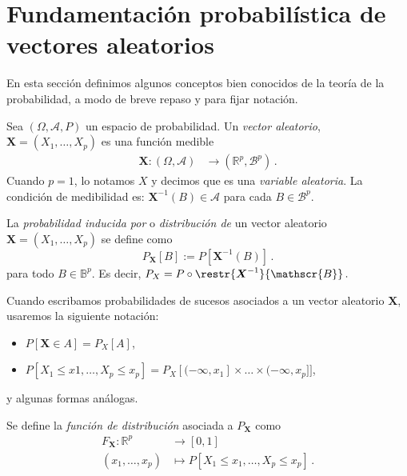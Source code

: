 \section{Fundamentación probabilística de vectores aleatorios}

En esta sección definimos algunos conceptos bien conocidos de la teoría de la probabilidad,
a modo de breve repaso y para fijar notación.


\begin{ndef}
    Sea $(\Omega, \mathscr{A}, P)$ un espacio de probabilidad. Un \emph{vector aleatorio}, $\boldsymbol X = (X_1, \dots, X_p)$ es una función medible
    \begin{align*}
      \boldsymbol X:(\Omega, \mathscr{A}) &\rightarrow (\mathbb{R}^p, \mathscr{B}^p)\,.
    \end{align*}
     Cuando $p=1$, lo notamos $X$ y decimos que es una \emph{variable aleatoria}.
    La condición de medibilidad es: \(\boldsymbol X^{-1}(B) \in \mathscr{A}\) para cada \( B \in \mathscr{B}^p\).
\end{ndef}



\begin{ndef}
    La \emph{probabilidad inducida por} o \emph{distribución de} un vector aleatorio $\boldsymbol X = (X_1, \dots, X_p)$ se define como
    \[
    P_{\boldsymbol X}[B] := P[\boldsymbol X^{-1}(B)]\,.\] para todo \(B \in \mathbb{B}^p\). Es decir, $P_X = P \circ \restr{\boldsymbol X^{-1}}{\mathscr{B}}\,.$
\end{ndef}

\begin{notacion}
  Cuando escribamos probabilidades de sucesos asociados a un vector aleatorio $\boldsymbol X$, usaremos la siguiente notación:
  \begin{itemize}
  \item $P[\boldsymbol X \in A] = P_X[A]$,
  \item $P[X_1 \le x1, \dots, X_p \le x_p] = P_X[(-\infty, x_1]\times \dots \times (-\infty, x_p]]$,
  \end{itemize}
  y algunas formas análogas.
\end{notacion}

\begin{ndef}
    Se define la \emph{función de distribución} asociada a $P_{\boldsymbol X}$ como
    \begin{align*}
    F_{\boldsymbol X}:\mathbb{R}^p &\rightarrow [0,1] \\
    (x_1,\dots,x_p) &\mapsto P[X_1 \leq x_1, \dots, X_p \leq x_p]\,.
    \end{align*}
\end{ndef}

